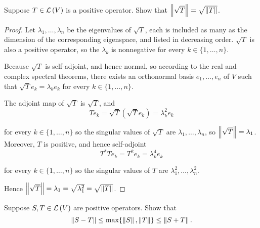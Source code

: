\begin{exercise}\label{chapter7:sectionF:exercise12}
    Suppose $T\in\mathcal{L}\left({V}\right)$ is a positive operator. Show that $\left\Vert{\sqrt{T}}\right\Vert = \sqrt{\left\Vert{T}\right\Vert}$.
\end{exercise}

\begin{proof}
    Let $\lambda_{1}, \ldots, \lambda_{n}$ be the eigenvalues of $\sqrt{T}$, each is included as many as the dimension of the corresponding eigenspace, and listed in decreasing order. $\sqrt{T}$ is also a positive operator, so the $\lambda_{k}$ is nonnegative for every $k\in\{1,\ldots,n\}$.

    Because $\sqrt{T}$ is self-adjoint, and hence normal, so according to the real and complex spectral theorems, there exists an orthonormal basis $e_{1}, \ldots, e_{n}$ of $V$ such that $\sqrt{T}e_{k} = \lambda_{k}e_{k}$ for every $k\in\{1,\ldots, n\}$.

    The adjoint map of $\sqrt{T}$ is $\sqrt{T}$, and
    \[
        Te_{k} = \sqrt{T}(\sqrt{T}e_{k}) = \lambda_{k}^{2}e_{k}
    \]

    for every $k\in\{1,\ldots,n\}$ so the singular values of $\sqrt{T}$ are $\lambda_{1}, \ldots, \lambda_{n}$, so $\left\Vert{\sqrt{T}}\right\Vert = \lambda_{1}$. Moreover, $T$ is positive, and hence self-adjoint
    \[
        T^{*}Te_{k} = T^{2}e_{k} = \lambda_{k}^{4}e_{k}
    \]

    for every $k\in\{1,\ldots,n\}$ so the singular values of $T$ are $\lambda_{1}^{2}, \ldots, \lambda_{n}^{2}$.

    Hence $\left\Vert{\sqrt{T}}\right\Vert = \lambda_{1} = \sqrt{\lambda_{1}^{2}} = \sqrt{\left\Vert{T}\right\Vert}$.
\end{proof}
\newpage

\begin{exercise}
    Suppose $S, T\in\mathcal{L}\left({V}\right)$ are positive operators. Show that
    \[
        \left\Vert{S - T}\right\Vert\leq \max\{ \left\Vert{S}\right\Vert, \left\Vert{T}\right\Vert \} \leq \left\Vert{S + T}\right\Vert.
    \]
\end{exercise}

